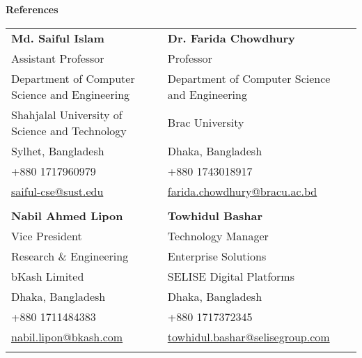 \begin{rSection}{\textbf{References}}

\noindent \begin{tabular}{@{} l l}

   \textbf{Md. Saiful Islam} & \textbf{Dr. Farida Chowdhury} \\
 
 \small{Assistant Professor} &  \small{Professor}  \\
 
  \small{Department of Computer Science and Engineering} &  \small{Department of Computer Science and Engineering} \\

  \small{Shahjalal University of Science and Technology} & \small{Brac University} \\

  \small{Sylhet, Bangladesh} & \small{Dhaka, Bangladesh} \\
  \small{+880 1717960979} & \small{+880 1743018917} \\
  
  \small{\href{mailto:saiful-cse@sust.edu}{saiful-cse@sust.edu}} & \small{\href{mailto:farida.chowdhury@bracu.ac.bd}{farida.chowdhury@bracu.ac.bd}} \\
  \\

 \textbf{Nabil Ahmed Lipon} & \textbf{Towhidul Bashar}  \\ 
 
 \small{Vice President} &    \small{Technology Manager}\\
 
  \small{Research \& Engineering} & Enterprise Solutions\\

 \small{bKash Limited} & \small{SELISE Digital Platforms} \\

  \small{Dhaka, Bangladesh} &  \small{Dhaka, Bangladesh} \\
    \small{+880 1711484383} &  \small{+880 1717372345}\\
  \small{\href{mailto:nabil.lipon@bkash.com}{nabil.lipon@bkash.com}} & 
  \small{\href{mailto:towhidul.bashar@selisegroup.com}{towhidul.bashar@selisegroup.com}}\\

  

  
 \\

\end{tabular}
\end{rSection}